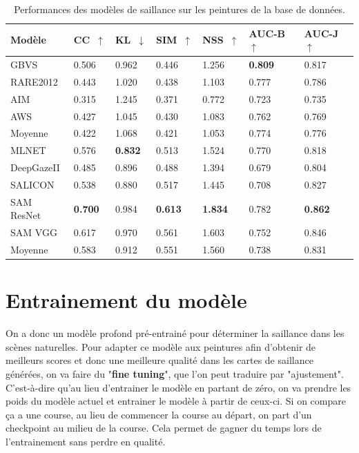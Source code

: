 \begin{table}[ht]
    \centering
        \begin{tabular}{|l|l|l|l|l|l|l|}
		\hline
        Modèle & CC~$\uparrow$ & KL~$\downarrow$ & SIM~$\uparrow$ & NSS~$\uparrow$ & AUC-B~$\uparrow$ & AUC-J~$\uparrow$\\
		\hline
        GBVS        & 0.506 & 0.962 & 0.446 & 1.256 & \textbf{0.809} & 0.817\\
        RARE2012    & 0.443 & 1.020 & 0.438 & 1.103 & 0.777 & 0.786\\
        AIM         & 0.315 & 1.245 & 0.371 & 0.772 & 0.723 & 0.735\\
        AWS         & 0.427 & 1.045 & 0.430 & 1.083 & 0.762 & 0.769\\
		\hline
        Moyenne     & 0.422 & 1.068 & 0.421 & 1.053 & 0.774 & 0.776\\
		\hline
        MLNET       & 0.576 & \textbf{0.832} & 0.513 & 1.524 & 0.770 & 0.818\\
        DeepGazeII  & 0.485 & 0.896 & 0.488 & 1.394 & 0.679 & 0.804\\
        SALICON     & 0.538 & 0.880 & 0.517 & 1.445 & 0.708 & 0.827\\
        SAM ResNet  & \textbf{0.700} & 0.984 & \textbf{0.613} & \textbf{1.834} & 0.782 & \textbf{0.862}\\
        SAM VGG     & 0.617 & 0.970 & 0.561 & 1.603 & 0.752 & 0.846\\
		\hline
        Moyenne     & 0.583 & 0.912 & 0.551 & 1.560 & 0.738 & 0.831\\
		\hline
        \end{tabular}
    \caption{Performances des modèles de saillance sur les peintures de la base de données.}
    \label{tab:scores}
\end{table}

\vfill

\newpage
\section{Entrainement du modèle}

\par
On a donc un modèle profond pré-entrainé pour déterminer la saillance dans les scènes naturelles. Pour adapter ce modèle aux peintures afin d'obtenir de meilleurs scores et donc une meilleure qualité dans les cartes de saillance générées, on va faire du "\textbf{fine tuning}", que l'on peut traduire par "ajustement". C'est-à-dire qu'au lieu d'entrainer le modèle en partant de zéro, on va prendre les poids du modèle actuel et entrainer le modèle à partir de ceux-ci. Si on compare ça a une course, au lieu de commencer la course au départ, on part d'un checkpoint au milieu de la course. Cela permet de gagner du temps lors de l'entrainement sans perdre en qualité.

